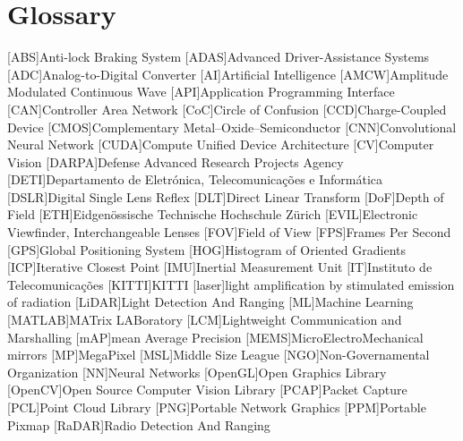 \chapter{Glossary}

\footnotesize
\SingleSpacing

\begin{multicols}{2} 
\begin{acronym}[AAAAAA]
	[ABS]{Anti-lock Braking System}
	[ADAS]{Advanced Driver-Assistance Systems}
	[ADC]{Analog-to-Digital Converter}
	[AI]{Artificial Intelligence}
	[AMCW]{Amplitude Modulated Continuous Wave}
	[API]{Application Programming Interface}
	[CAN]{Controller Area Network} 
	[CoC]{Circle of Confusion}
	[CCD]{Charge-Coupled Device}
	[CMOS]{Complementary Metal–Oxide–Semiconductor}
	[CNN]{Convolutional Neural Network}
	[CUDA]{Compute Unified Device Architecture}
	[CV]{Computer Vision}
	[DARPA]{Defense Advanced Research Projects Agency}
	[DETI]{Departamento de Eletrónica, Telecomunicações e Informática}
	[DSLR]{Digital Single Lens Reflex}
	[DLT]{Direct Linear Transform}
	[DoF]{Depth of Field}
	[ETH]{Eidgenössische Technische Hochschule Zürich}
	[EVIL]{Electronic Viewfinder, Interchangeable Lenses}
	[FOV]{Field of View}
	[FPS]{Frames Per Second}
	[GPS]{Global Positioning System}
	[HOG]{Histogram of Oriented Gradients}
	[ICP]{Iterative Closest Point}
	[IMU]{Inertial Measurement Unit}
	[IT]{Instituto de Telecomunicações}
	[KITTI]{KITTI}
	[laser]{light amplification by stimulated emission of radiation}
	[LiDAR]{Light Detection And Ranging}
	[ML]{Machine Learning}
	[MATLAB\textsuperscript{\tiny\textregistered}]{MATrix LABoratory\textsuperscript{\tiny\textregistered}}
	[LCM]{Lightweight Communication and Marshalling}
	[mAP]{mean Average Precision}
	[MEMS]{MicroElectroMechanical mirrors}
	[MP]{MegaPixel}
	[MSL]{Middle Size League}
	[NGO]{Non-Governamental Organization} 
	[NN]{Neural Networks}
	[OpenGL]{Open Graphics Library}
	[OpenCV]{Open Source Computer Vision Library}
	[PCAP]{Packet Capture}
	[PCL]{Point Cloud Library}
	[PNG]{Portable Network Graphics}
	[PPM]{Portable Pixmap}
	[RaDAR]{Radio Detection And Ranging}

\end{acronym}
\end{multicols}
